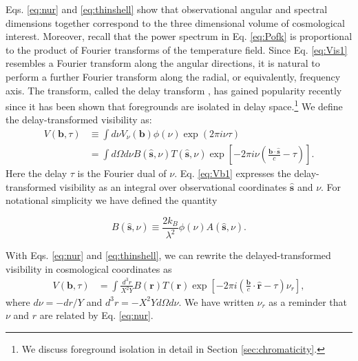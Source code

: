 \documentclass[twocolumn,apj,numberedappendix]{emulateapj}
\renewcommand\[{\begin{equation}}
\renewcommand\]{\end{equation}}
\begin{document}
Eqs. \eqref{eq:nur} and \eqref{eq:thinshell} show that observational angular and spectral dimensions together correspond to the three dimensional volume of cosmological interest. Moreover, recall that the power spectrum in Eq. \eqref{eq:Pofk} is proportional to the product of Fourier transforms of the temperature field. Since Eq. \eqref{eq:Vis1} resembles a Fourier transform along the angular directions, it is natural to perform a further Fourier transform along the radial, or equivalently, frequency axis. The transform, called the delay transform \citep{PB2009}, has gained popularity recently since it has been shown that foregrounds are isolated in delay space.\footnote{We discuss foreground isolation in detail in Section \ref{sec:chromaticity}.} We define the delay-transformed visibility as:
\small
\begin{equation}
\begin{aligned}V(\boldsymbol{b},\tau) & \equiv \int d\nu V_{\nu}(\boldsymbol{b})\phi(\nu)\exp\left(2\pi i\nu\tau\right)\\
 & =\int d\Omega d\nu B(\hat{\boldsymbol{s}},\nu)T(\hat{\boldsymbol{s}},\nu)\exp\left[-2\pi i\nu\left(\frac{\boldsymbol{b}\cdot\hat{\boldsymbol{s}}}{c}-\tau\right)\right]. 
\end{aligned}
\label{eq:Vb1}
\end{equation}
\normalsize
Here the delay $\tau$ is the Fourier dual of $\nu$. Eq. \eqref{eq:Vb1} expresses the delay-transformed visibility as
an integral over observational coordinates $\hat{\boldsymbol{s}}$ and $\nu$. For notational simplicity we have defined the quantity

\[
B(\hat{\boldsymbol{s}},\nu) \equiv \frac{2k_B}{\lambda^2}\phi(\nu)A(\hat{\boldsymbol{s}},\nu). 
\label{eq:B}
\]

With Eqs. \eqref{eq:nur} and \eqref{eq:thinshell}, we can rewrite the delayed-transformed visibility in cosmological coordinates as 
\small
\[
\begin{aligned}V(\boldsymbol{b},\tau) & =\int\frac{d^{3}r}{X^{2}Y}B(\boldsymbol{r})T(\boldsymbol{r})\exp\left[-2\pi i\left(\frac{\boldsymbol{b}}{c}\cdot\hat{\boldsymbol{r}}-\tau\right)\nu_{r}\right],
\end{aligned}
\]
\normalsize
\!\!where $d\nu=-dr/Y$ and $d^{3}r=-X^{2}Yd\Omega d\nu$. 
We have written $\nu_{r}$ as a reminder that $\nu$ and $r$ are related
by Eq. \eqref{eq:nur}. 
\end{document}
